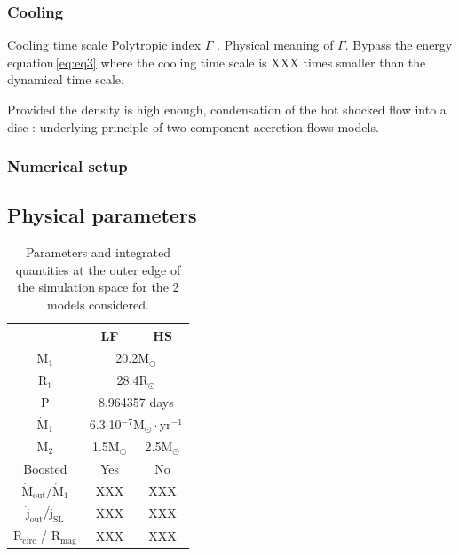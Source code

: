 \documentclass[a4paper,fleqn,usenatbib]{mnras}
\begin{document}
\subsubsection{Cooling}
\label{sec:cool}

Cooling time scale \citep{Schure2009}
Polytropic index $\Gamma$ \citep{Horedt2000}. Physical meaning of $\Gamma$. Bypass the energy equation\,\ref{eq:eq3} where the cooling time scale is XXX times smaller than the dynamical time scale.

Provided the density is high enough, condensation of the hot shocked flow into a disc \citep[][and references therein]{Taam2018} : underlying principle of two component accretion flows models.

\subsubsection{Numerical setup}
\label{sec:num_set}

\subsection{Physical parameters}
\label{sec:params}

\begin{table}
\centering
\caption{Parameters and integrated quantities at the outer edge of the simulation space for the 2 models considered.}
\label{tab:params}
\begin{tabularx}{\linewidth}{c|c|c}
   & LF & HS \\
  \hline
  M$_1$ & \multicolumn{2}{c}{20.2M$_{\odot}$} \\
  R$_1$ & \multicolumn{2}{c}{28.4R$_{\odot}$} \\
  P & \multicolumn{2}{c}{8.964357 days} \\  
  $\dot{\text{M}}_1$ & \multicolumn{2}{c}{6.3$\cdot$10$^{-7}$M$_{\odot}\cdot$yr$^{-1}$} \\
  \hline
  M$_2$ & 1.5M$_{\odot}$  & 2.5M$_{\odot}$  \\
  Boosted & Yes & No  \\
  \hline
  $\dot{\text{M}}_{\text{out}}/\dot{\text{M}}_1$ & XXX & XXX  \\
  $\dot{\text{j}}_{\text{out}}/\dot{\text{j}}_{\text{SL}}$ & XXX & XXX \\
  R$_{\text{circ}}$ / R$_{\text{mag}}$ & XXX & XXX \\
\end{tabularx}
\end{table}
\end{document}
